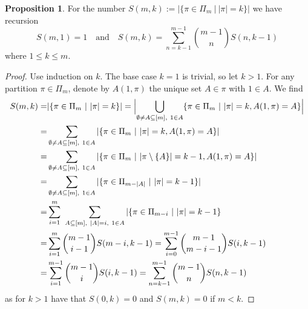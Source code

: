 \documentclass{scrartcl}
\theoremstyle{definition}
\newtheorem{proposition}[definition]{Proposition}
\begin{document}
\begin{proposition}
    \label{prop:partitions_recursion}
    For the number $S(m, k) := |\{ \pi \in \Pi_m \ | \ |\pi| = k\}|$ we have recursion
    \begin{equation*}
        S(m, 1) = 1 \quad \text{and} \quad S(m, k) = \sum_{n = k - 1}^{m - 1} {m - 1 \choose n} S(n, k - 1)
    \end{equation*}
    where $1 \leq k \leq m$.
\end{proposition}
\begin{proof}
    Use induction on $k$. 
    The base case $k = 1$ is trivial, so let $k > 1$.
    For any partition $\pi \in \Pi_m$, denote by $A(1, \pi)$ the unique set $A \in \pi$ with $1 \in A$.
    We find
    \begin{align*}
        S(m, k) =& |\{ \pi \in \Pi_m \ | \ |\pi| = k \}| = \Bigl| \bigcup_{\emptyset \neq A \subseteq [m], \ 1 \in A} \{ \pi \in \Pi_m \ | \ |\pi| = k, A(1, \pi) = A \} \Bigr| \\
        =& \sum_{\emptyset \neq A \subseteq [m], \ 1 \in A} |\{ \pi \in \Pi_m \ | \ |\pi| = k, A(1, \pi) = A \}| \\
        =& \sum_{\emptyset \neq A \subseteq [m], \ 1 \in A} |\{ \pi \in \Pi_m \ | \ |\pi \setminus \{A\}| = k - 1, A(1, \pi) = A\}| \\
        =& \sum_{\emptyset \neq A \subseteq [m], \ 1 \in A} |\{ \pi \in \Pi_{m - |A|} \ | \ |\pi| = k - 1 \}| \\
        =& \sum_{i = 1}^m \ \sum_{A \subseteq [m], \ |A| = i, \ 1 \in A} |\{ \pi \in \Pi_{m - i} \ | \ |\pi| = k - 1 \} \\
        =& \sum_{i = 1}^m {m - 1 \choose i - 1} S(m - i, k - 1) = \sum_{i = 0}^{m - 1} {m - 1 \choose m - i - 1} S(i, k - 1) \\
        =& \sum_{i = 1}^{m - 1} {m - 1 \choose i} S(i, k - 1) = \sum_{n = k - 1}^{m - 1} {m - 1 \choose n} S(n, k - 1)
    \end{align*}
    as for $k > 1$ have that $S(0, k) = 0$ and $S(m, k) = 0$ if $m < k$.
\end{proof}
\end{document}
